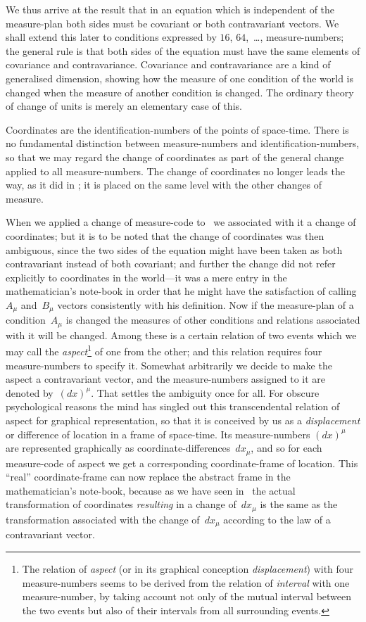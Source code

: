 \documentclass[12pt]{book}
\begin{document}
We thus arrive at the result that in an equation which is independent
of the measure-plan both sides must be covariant or both contravariant
vectors. We shall extend this later to conditions expressed by $16$, $64$,~\dots,
measure-numbers; the general rule is that both sides of the equation must
have the same elements of covariance and contravariance. Covariance and
contravariance are a kind of generalised dimension, showing how the measure
of one condition of the world is changed when the measure of another condition
is changed. The ordinary theory of change of units is merely an
elementary case of this.

Coordinates are the identification-numbers of the points of space-time.
There is no fundamental distinction between measure-numbers and identification-numbers,
so that we may regard the change of coordinates as part of the
general change applied to all measure-numbers. The change of coordinates
no longer leads the way, as it did in ; it is placed on the same level with
the other changes of measure.

When we applied a change of measure-code to~ we associated with
it a change of coordinates; but it is to be noted that the change of coordinates
%
was then ambiguous, since the two sides of the equation might have been
taken as both contravariant instead of both covariant; and further the change
did not refer explicitly to coordinates in the world---it was a mere entry in
the mathematician's note-book in order that he might have the satisfaction
of calling $A_{\mu}$ and~$B_{\mu}$ vectors consistently with his definition. Now if the
measure-plan of a condition~$A_{\mu}$ is changed the measures of other conditions
and relations associated with it will be changed. Among these is a certain
relation of two events which we may call the \emph{aspect}\footnote
  {The relation of \emph{aspect} (or in its graphical conception \emph{displacement}) with four measure-numbers
%
%
  seems to be derived from the relation of \emph{interval} with one measure-number, by taking
  account not only of the mutual interval between the two events but also of their intervals from
  all surrounding events.}
of one from the other;
and this relation requires four measure-numbers to specify it. Somewhat
arbitrarily we decide to make the aspect a contravariant vector, and the
measure-numbers assigned to it are denoted by~$(dx)^{\mu}$. That settles the ambiguity
once for all. For obscure psychological reasons the mind has singled
out this transcendental relation of aspect for graphical representation, so that
it is conceived by us as a \emph{displacement} or difference of location in a frame of
space-time. Its measure-numbers $(dx)^{\mu}$ are represented graphically as coordinate-differences~$dx_{\mu}$,
and so for each measure-code of aspect we get a corresponding
coordinate-frame of location. This ``real'' coordinate-frame can now
replace the abstract frame in the mathematician's note-book, because as we
have seen in~ the actual transformation of coordinates \emph{resulting} in a
change of~$dx_{\mu}$ is the same as the transformation associated with the change of~$dx_{\mu}$
according to the law of a contravariant vector.
\end{document}

